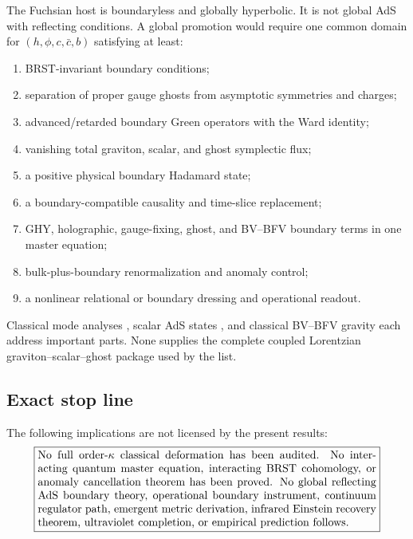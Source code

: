\documentclass[11pt]{article}
\theoremstyle{definition}
\theoremstyle{remark}
\newcommand{\cbar}{\bar c}
\begin{document}
The Fuchsian host is boundaryless and globally hyperbolic.  It is not global AdS with
reflecting conditions.  A global promotion would require one common domain for
$(h,\phi,c,\cbar,b)$ satisfying at least:
\begin{enumerate}[label=\textbf{B\arabic*:},leftmargin=14mm]
 \item BRST-invariant boundary conditions;
 \item separation of proper gauge ghosts from asymptotic symmetries and charges;
 \item advanced/retarded boundary Green operators with the Ward identity;
 \item vanishing total graviton, scalar, and ghost symplectic flux;
 \item a positive physical boundary Hadamard state;
 \item a boundary-compatible causality and time-slice replacement;
 \item GHY, holographic, gauge-fixing, ghost, and BV--BFV boundary terms in one master
       equation;
 \item bulk-plus-boundary renormalization and anomaly control;
 \item a nonlinear relational or boundary dressing and operational readout.
\end{enumerate}
Classical mode analyses \cite{IshibashiWald2004}, scalar AdS states
\cite{DappiaggiFerreira2017}, and classical BV--BFV gravity
\cite{CattaneoSchiavina2016} each address important parts.  None supplies the complete
coupled Lorentzian graviton--scalar--ghost package used by the list.

\subsection{Exact stop line}

The following implications are not licensed by the present results:
\begin{equation}
 \boxed{
 \begin{minipage}{0.88\textwidth}
 No full order-$\kappa$ classical deformation has been audited.  No interacting
 quantum master equation, interacting BRST cohomology, or anomaly cancellation
 theorem has been proved.  No global reflecting AdS boundary theory, operational
 boundary instrument, continuum regulator path, emergent metric derivation, infrared
 Einstein recovery theorem, ultraviolet completion, or empirical prediction follows.
 \end{minipage}}
 \label{eq:stopline}
\end{equation}
\end{document}
